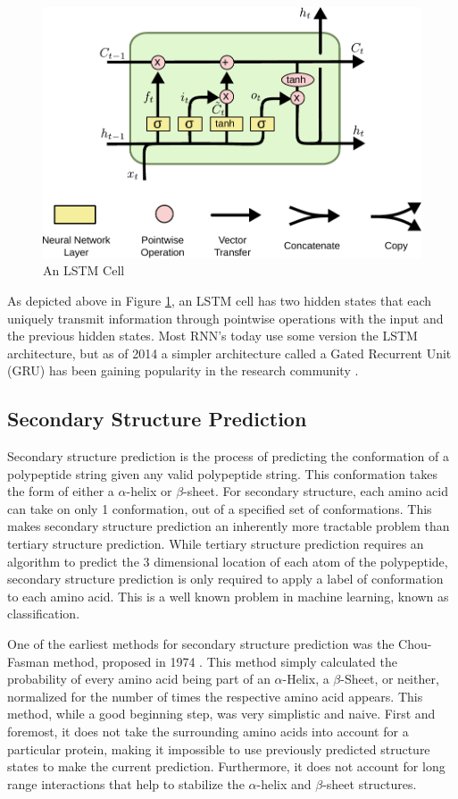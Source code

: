 \documentclass[pageno]{jpaper}
\begin{document}
\begin{figure}[H]
	\centering
	\includegraphics[scale=0.75]{LSTM.pdf}
	\caption{An LSTM Cell \cite{olah:2015}}
	\label{fg:lstm}
\end{figure}

As depicted above in Figure \ref{fg:lstm}, an LSTM cell has two hidden states that each uniquely transmit information through pointwise operations with the input and the previous hidden states.  Most RNN's today use some version the LSTM architecture, but as of 2014 a simpler architecture called a Gated Recurrent Unit (GRU) has been gaining popularity in the research community \cite{cho:2014}.

\subsection{Secondary Structure Prediction}
Secondary structure prediction is the process of predicting the conformation of a polypeptide string given any valid polypeptide string.  This conformation takes the form of either a $\alpha$-helix or $\beta$-sheet.  For secondary structure, each amino acid can take on only 1 conformation, out of a specified set of conformations.  This makes secondary structure prediction an inherently more tractable problem than tertiary structure prediction.  While tertiary structure prediction requires an algorithm to predict the 3 dimensional location of each atom of the polypeptide, secondary structure prediction is only required to apply a label of conformation to each amino acid.  This is a well known problem in machine learning, known as classification.

\par
One of the earliest methods for secondary structure prediction was the Chou-Fasman method, proposed in 1974 \cite{singh:2005}.  This method simply calculated the probability of every amino acid being part of an $\alpha$-Helix, a $\beta$-Sheet, or neither, normalized for the number of times the respective amino acid appears.  This method, while a good beginning step, was very simplistic and naive.  First and foremost, it does not take the surrounding amino acids into account for a particular protein, making it impossible to use previously predicted structure states to make the current prediction.  Furthermore, it does not account for long range interactions that help to stabilize the $\alpha$-helix and $\beta$-sheet structures.
\end{document}
